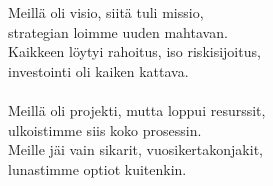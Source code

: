 
            Meillä oli visio, siitä tuli missio, \\
            strategian loimme uuden mahtavan. \\
            Kaikkeen löytyi rahoitus, iso riskisijoitus, \\
            investointi oli kaiken kattava. \\
\hspace{10mm} \\
            Meillä oli projekti, mutta loppui resurssit, \\
            ulkoistimme siis koko prosessin. \\
            Meille jäi vain sikarit, vuosikertakonjakit, \\
            lunastimme optiot kuitenkin. \\
